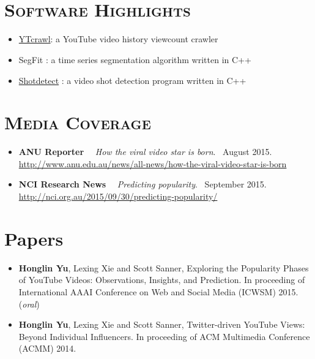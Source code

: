 \begin{resume}
\begin{formatb}
  \\
  \body\\
\end{formatb}

\section{\textsc{Software Highlights}}
\begin{itemize}
\item \href{https://github.com/yuhonglin/YTCrawl}{YTcrawl}: a YouTube video history viewcount crawler
\item SegFit : a time series segmentation algorithm written in C++
\item \href{https://github.com/yuhonglin/shotdetect}{Shotdetect} : a video shot detection program written in C++
\end{itemize}

\section{\textsc{Media Coverage}}
\begin{itemize}
  \item {\bf ANU Reporter} \ \ {\it How the viral video star is born}. \ August 2015.\\
    \url{http://www.anu.edu.au/news/all-news/how-the-viral-video-star-is-born}
  \item {\bf NCI Research News} \ \ {\it Predicting popularity}. \ September 2015.\\
    \url{http://nci.org.au/2015/09/30/predicting-popularity/}
\end{itemize}


\section{Papers}
\begin{itemize}
\item {\bf Honglin Yu}, Lexing Xie and Scott Sanner, Exploring the Popularity Phases of YouTube Videos: Observations, Insights, and Prediction. In proceeding of International AAAI Conference on Web and Social Media (ICWSM) 2015. ({\it oral})
\item {\bf Honglin Yu}, Lexing Xie and Scott Sanner, Twitter-driven YouTube Views: Beyond Individual Influencers. In proceeding of ACM Multimedia Conference (ACMM) 2014.  
\end{itemize} 




\end{resume}
